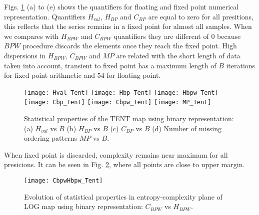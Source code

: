 Figs. \ref{fig:TENT_QuantiB} (a) to (e) shows the quantifiers for floating and fixed point numerical representation.
Quantifiers $H_{val}$, $H_{BP}$ and $C_{BP}$ are equal to zero for all presitions, this reflects that the series remains in a fixed point for almost all samples. 
When we compares with $H_{BPW}$ and $C_{BPW}$ quantifiers they are different of $0$ because $BPW$ procedure discards the elements once they reach the fixed point.
High dispersions in $H_{BPW}$, $C_{BPW}$ and $MP$ are related with the short length of data taken into account, transient to fixed point has a maximum length of $B$ iterations for fixed point arithmetic and $54$ for floating point.

\begin{figure}
	\texttt{[image: Hval\_Tent]}
	\texttt{[image: Hbp\_Tent]}
	\texttt{[image: Hbpw\_Tent]}
	\texttt{[image: Cbp\_Tent]}
	\texttt{[image: Cbpw\_Tent]}
	\texttt{[image: MP\_Tent]}
	\caption{Statistical properties of the TENT map using binary representation: (a) $H_{val}$ vs $B$ (b) $H_{BP}$ vs $B$ (c) $C_{BP}$ vs $B$ (d) Number of missing ordering patterns $MP$ vs $B$.}
	\label{fig:TENT_QuantiB}
\end{figure}

When fixed point is discarded, complexity remains near maximum for all presicions.
It can be seen in Fig. \ref{fig:TENT_HC}, where all points are close to upper margin.

\begin{figure}
	\texttt{[image: CbpwHbpw\_Tent]}
	\caption{Evolution of statistical properties in entropy-complexity plane of LOG map using binary representation: $C_{BPW}$ vs $H_{BPW}$.}
	\label{fig:TENT_HC}
\end{figure}
